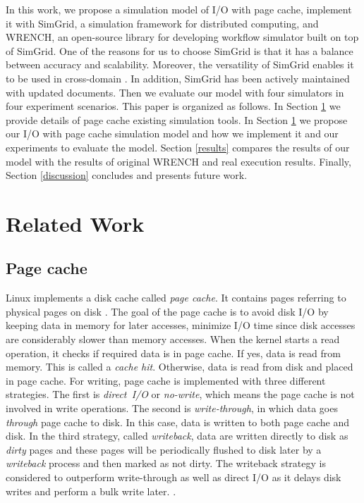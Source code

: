 \documentclass[conference]{IEEEtran}
\begin{document}
		In this work, we propose a simulation model of I/O with page cache, 
		implement it with SimGrid, a simulation framework for distributed computing, 
		and WRENCH, an open-source library for developing workflow simulator 
		built on top of SimGrid. 
		One of the reasons for us to choose SimGrid is that it has a balance 
		between accuracy and scalability. Moreover, the versatility of SimGrid 
		enables it to be used in cross-domain \cite{casanova2014simgrid}. 
		In addition, SimGrid has been actively maintained with updated documents. 
		Then we evaluate our model with four simulators in four experiment scenarios. 
		This paper is organized as follows. 
		In Section \ref{relatedwork} we provide details of page cache 
		existing simulation tools.
		In Section \ref{relatedwork} we propose our I/O with page 
		cache simulation model and how we implement it and our experiments 
		to evaluate the model.  
		Section \ref{results} compares the results of our model with the results 
		of original WRENCH and real execution results. 
		Finally, Section \ref{discussion} concludes and presents future 
		work.  
		
	\section{Related Work}		
	\label{relatedwork}	
		
		\subsection{Page cache}							
			
			Linux implements a disk cache called \textit{page cache}. 
			It contains pages referring to physical pages on disk \cite{linuxdev3rd2010}.
			The goal of the page cache is to avoid disk I/O by keeping data in memory 
			for later accesses, minimize I/O time since disk accesses are considerably 
			slower than memory accesses.
			When the kernel starts a read operation, it checks if required data is in page cache.
			If yes, data is read from memory. This is called a \textit{cache hit}. 
			Otherwise, data is read from disk and placed in page cache.
			For writing, page cache is implemented with three different strategies. 
			The first is \textit{direct~I/O} or \textit{no-write}, which means the page cache 
			is not involved in write operations. 
			The second is \textit{write-through}, in which data goes \textit{through} 
			page cache to disk. In this case, data is written to both page cache and disk. 
			In the third strategy, called \textit{writeback}, data are written directly 
			to disk as \textit{dirty} pages and these pages will be periodically flushed 
			to disk later by a \textit{writeback} process and then marked as not dirty. 
			The writeback strategy is considered to outperform write-through as well as 
			direct I/O as it delays disk writes and perform a bulk write later.
			\cite{linuxdev3rd2010}. 
			
\end{document}
